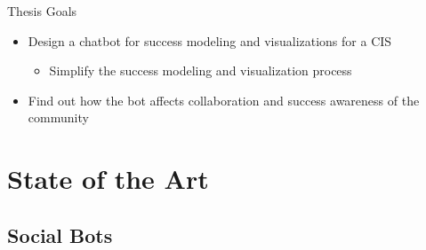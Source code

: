 \begin{frame}{Thesis Goals}
  \begin{itemize}
    \item Design a chatbot for success modeling and visualizations for a CIS
    \begin{itemize}
        \item Simplify the success modeling and visualization process 
    \end{itemize}
    \item Find out how the bot affects collaboration and success awareness of the community %
  \end{itemize}
\end{frame}







\section{State of the Art}

\subsection{Social Bots}

